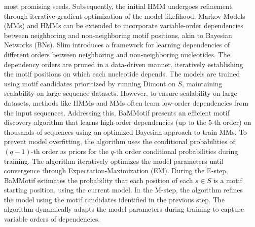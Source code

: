 \documentclass[a4paper, titlepage, openright]{book}
\begin{document}
most promising seeds. Subsequently, the initial HMM undergoes refinement through iterative gradient optimization of the model likelihood. Markov Models (MMs) and HMMs can be extended to incorporate variable-order dependencies between neighboring and non-neighboring motif positions, akin to Bayesian Networks (BNs). Slim \citep{keilwagen2015varying} introduces a framework for learning dependencies of different orders between neighboring and non-neighboring nucleotides. The dependency orders are pruned in a data-driven manner, iteratively establishing the motif positions on which each nucleotide depends. The models are trained using motif candidates prioritized by running Dimont on $S$, maintaining scalability on large sequence datasets. However, to ensure scalability on large datasets, methods like HMMs and MMs often learn low-order dependencies from the input sequences. Addressing this, BaMMotif \citep{siebert2016bayesian,ge2021bayesian} presents an efficient motif discovery algorithm that learns high-order dependencies (up to the 5-th order) on thousands of sequences using an optimized Bayesian approach to train MMs. To prevent model overfitting, the algorithm uses the conditional probabilities of $(q-1)$-th order as priors for the $q$-th order conditional probabilities during training. The algorithm iteratively optimizes the model parameters until convergence through Expectation-Maximization (EM). During the E-step, BaMMotif estimates the probability that each position of each $s \in S$ is a motif starting position, using the current model. In the M-step, the algorithm refines the model using the motif candidates identified in the previous step. The algorithm dynamically adapts the model parameters during training to capture variable orders of dependencies.

\end{document}
